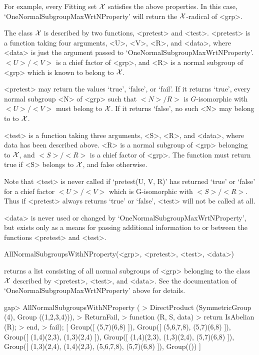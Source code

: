 For example, every Fitting set $\cal X$ satisfies the above properties. In
this case, `OneNormalSubgroupMaxWrtNProperty' will return the $\cal
X$-radical of <grp>.

The class $\cal X$ is described by two functions, <pretest> and <test>. 
<pretest> is a function taking four arguments, <U>, <V>, <R>, and <data>,
where <data> is just the argument passed to
`OneNormalSubgroupMaxWrtNProperty'. $<U>/<V>$ is a chief factor of <grp>,
and  <R> is a normal subgroup of <grp> which is known to belong to $\cal X$.

<pretest> may return the values `true', `false', or `fail'. If it returns 
`true', every normal subgroup <N> of <grp> such that $<N>/R>$ is $G$-isomorphic
with $<U>/<V>$ must belong to
$\cal X$. If it returns `false', no such <N> may belong to to $\cal X$. 

<test> is a function taking three arguments, <S>, <R>, and <data>, where
data has been described above. <R> is a normal subgroup of <grp> belonging to
$\cal X$, and $<S>/<R>$ is a chief factor of <grp>. The function must return
true if <S> belongs to $\cal X$, and false otherwise. 

Note that <test> is never called if `pretest(U, V, R)' has returned `true' or
`false' for a chief factor $<U>/<V>$ which is G-isomorphic with $<S>/<R>$.
Thus if <pretest> always returns `true' or `false', <test> will not be
called at all.

<data> is never used or changed by `OneNormalSubgroupMaxWrtNProperty', but
exists only as a means for passing additional information to or between
the functions <pretest> and <test>.


\>AllNormalSubgroupsWithNProperty(<grp>, <pretest>, <test>, <data>)

returns a list consisting of all normal subgroups of <grp> belonging 
to the class $\cal X$ described by <pretest>, <test>, and <data>. See
the documentation of `OneNormalSubgroupMaxWrtNProperty' above for details.

\beginexample
gap> AllNormalSubgroupsWithNProperty (
> DirectProduct (SymmetricGroup (4), Group ((1,2,3,4))),
>     ReturnFail,
>     function (R, S, data)
>         return IsAbelian (R);
>     end,
>     fail);
[ Group([ (5,7)(6,8) ]), Group([ (5,6,7,8), (5,7)(6,8) ]), 
  Group([ (1,4)(2,3), (1,3)(2,4) ]), 
  Group([ (1,4)(2,3), (1,3)(2,4), (5,7)(6,8) ]), 
  Group([ (1,3)(2,4), (1,4)(2,3), (5,6,7,8), (5,7)(6,8) ]), Group(()) ]
\endexample

